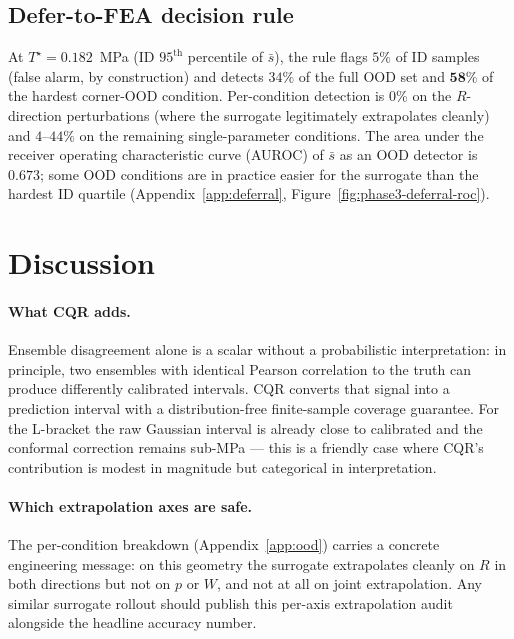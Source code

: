 \documentclass{article}
\begin{document}
\subsection{Defer-to-FEA decision rule}

At $T^\star = 0.182$~MPa (ID $95^{\text{th}}$ percentile of $\bar{s}$),
the rule flags $5\%$ of ID samples (false alarm, by construction) and
detects $34\%$ of the full OOD set and $\mathbf{58\%}$ of the
hardest corner-OOD condition. Per-condition detection is $0\%$ on the
$R$-direction perturbations (where the surrogate legitimately
extrapolates cleanly) and $4$--$44\%$ on the remaining single-parameter
conditions. The area under the receiver operating characteristic curve (AUROC) of
$\bar{s}$ as an OOD detector is $0.673$; some OOD conditions are in
practice easier for the surrogate than the hardest ID quartile
(Appendix~\ref{app:deferral}, Figure~\ref{fig:phase3-deferral-roc}).

\section{Discussion}

\paragraph{What CQR adds.} Ensemble disagreement alone is a scalar
without a probabilistic interpretation: in principle, two ensembles
with identical Pearson correlation to the truth can produce
differently calibrated intervals. CQR converts that signal into a prediction interval with a
distribution-free finite-sample coverage guarantee. For the L-bracket
the raw Gaussian interval is already close to calibrated and the
conformal correction remains sub-MPa --- this is a friendly case where
CQR's contribution is modest in magnitude but categorical in
interpretation.

\paragraph{Which extrapolation axes are safe.} The per-condition
breakdown (Appendix~\ref{app:ood}) carries a concrete engineering
message: on this geometry the surrogate extrapolates cleanly on
$R$ in both directions but not on $p$ or $W$, and not at all on joint
extrapolation. Any similar surrogate rollout should publish this
per-axis extrapolation audit alongside the headline accuracy number.
\end{document}
